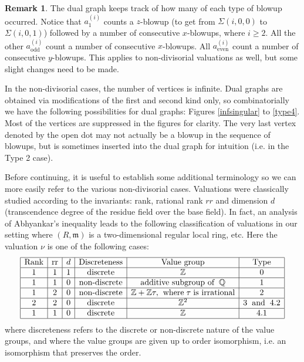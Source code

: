 \documentclass[11pt]{amsart}
\theoremstyle{definition}
\newtheorem*{rem}{Remark}
\begin{document}
{\begin{rem}
The dual graph keeps track of how many of each type of blowup occurred. Notice that $a_1^{(i)}$ counts a $z$-blowup (to get from $\Sigma(i,0,0)$ to $\Sigma(i,0,1)$) followed by a number of consecutive $x$-blowups, where $i\geq2$. All the other $\displaystyle a_{\text{odd}}^{(i)}$ count a number of consecutive $x$-blowups. All $\displaystyle a_{\text{even}}^{(i)}$ count a number of consecutive $y$-blowups. This applies to non-divisorial valuations as well, but some slight changes need to be made.
\end{rem}

In the non-divisorial cases, the number of vertices is infinite. Dual graphs are obtained via modifications of the first and second kind only, so combinatorially we have the following possibilities for dual graphs: Figures \ref{infsingular} to \ref{type4}. Most of the vertices are suppressed in the figures for clarity. The very last vertex denoted by the open dot may not actually be a blowup in the sequence of blowups, but is sometimes inserted into the dual graph for intuition (i.e. in the Type 2 case).

Before continuing, it is useful to establish some additional terminology so we can more easily refer to the various non-divisorial cases. Valuations were classically studied according to the invariants: rank, rational rank $rr$ and dimension $d$ (transcendence degree of the residue field over the base field). In fact, an analysis of Abhyankar's inequality leads to the following classification of valuations in our setting where $(R,\mathfrak{m})$ is a two-dimensional regular local ring, etc. Here the valuation $\nu$ is one of the following cases:
\begin{equation*}
\begin{array}{|c|c|c|c|c|c|} \hline
\text{Rank} & \text{rr} & d & \text{Discreteness} & \text{Value group} & \text{Type} \\ \hline
1 & 1 & 1 & \text{discrete} & \mathbb{Z} & 0 \\ \hline
1 & 1 & 0 & \text{non-discrete} & \text{additive subgroup of}\left.\right. \mathbb{Q}& 1 \\ \hline
1 & 2 & 0 & \text{non-discrete} & \mathbb{Z} + \mathbb{Z} \tau, \left.\right.\text{where} \left. \tau \right. \text{is irrational} & 2 \\ \hline
2 & 2 & 0 & \text{discrete} & \mathbb{Z}^{2} & 3 \left.\right.\text{and} \left.\right. 4.2\\ \hline
1 & 1 & 0 & \text{discrete} & \mathbb{Z} & 4.1 \\ \hline
\end{array}
\end{equation*}
where discreteness refers to the discrete or non-discrete nature of the value groups, and where the value groups are given up to order isomorphism, i.e. an isomorphism that preserves the order.

}
\end{document}
